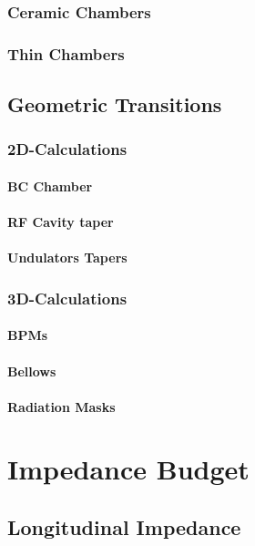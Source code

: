 \subsection{Ceramic Chambers}
\subsection{Thin Chambers}
\section{Geometric Transitions}
\subsection{2D-Calculations}
\subsubsection{BC Chamber}
\subsubsection{RF Cavity taper}
\subsubsection{Undulators Tapers}
\subsection{3D-Calculations}
\subsubsection{BPMs}
\subsubsection{Bellows}
\subsubsection{Radiation Masks}
\subsection{}

\chapter{Impedance Budget}
\section{Longitudinal Impedance}
